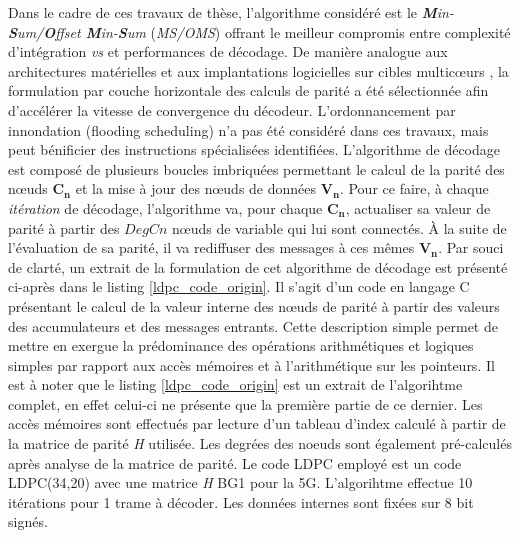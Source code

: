 \documentclass[../main.tex]{subfiles}
\begin{document}
Dans le cadre de ces travaux de thèse, l'algorithme considéré est le \textit{\textbf{M}in-\textbf{S}um/\textbf{O}ffset \textbf{M}in-\textbf{S}um} (\textit{MS/OMS}) offrant le meilleur compromis entre complexité d'intégration \textit{vs} et performances de décodage. De manière analogue aux architectures matérielles \cite{LDPC:APPROX:3,LDPC:APPROX:4} et aux implantations logicielles sur cibles multicœurs \cite{LDPC:SOFT4}, la formulation par couche horizontale des calculs de parité a été sélectionnée afin d'accélérer la vitesse de convergence du décodeur. L'ordonnancement par innondation (flooding scheduling) n'a pas été considéré dans ces travaux, mais peut bénificier des instructions spécialisées identifiées. 
L'algorithme de décodage est composé de plusieurs boucles imbriquées permettant le calcul de la parité des nœuds $\bm{C_n}$ et la mise à jour des nœuds de données $\bm{V_n}$. 
Pour ce faire, à chaque \textit{itération} de décodage, l'algorithme va, pour chaque $\bm{C_n}$, actualiser sa valeur de parité à partir des $DegCn$ nœuds de variable qui lui sont connectés. 
À la suite de l'évaluation de sa parité, il va rediffuser des messages à ces mêmes $\bm{V_n}$. Par souci de clarté, un extrait de la formulation de cet algorithme de décodage est présenté ci-après dans le listing \ref{ldpc_code_origin}. Il s'agit d'un code en langage C présentant le calcul de la valeur interne des nœuds de parité à partir des valeurs des accumulateurs et des messages entrants. Cette description simple permet de mettre en exergue la prédominance des opérations arithmétiques et logiques simples par rapport aux accès mémoires et à l'arithmétique sur les pointeurs.
Il est à noter que le listing \ref{ldpc_code_origin} est un extrait de l'algorihtme complet, en effet celui-ci ne présente que la première partie de ce dernier. Les accès mémoires sont effectués par lecture d'un tableau d'index calculé à partir de la matrice de parité \textit{H} utilisée. Les degrées des noeuds sont également pré-calculés après analyse de la matrice de parité. Le code LDPC employé est un code LDPC(34,20) avec une matrice \textit{H} BG1 pour la 5G. L'algorihtme effectue 10 itérations pour 1 trame à décoder. Les données internes sont fixées sur 8 bit signés. 
\end{document}
